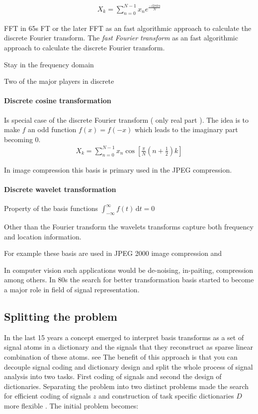 \begin{align*}
 X_k = \sum_{n=0}^{N-1}x_ne^{\frac{-i2\pi kn}{N}}
\end{align*}

FFT in 65s
FT or the later FFT as an fast algorithmic approach to calculate the discrete
Fourier transform.
The \emph{fast Fourier transform}  as an fast algorithmic approach to calculate
the discrete Fourier transform.



Stay in the frequency domain

Two of the major players in discrete 

\paragraph{Discrete cosine transformation}
Is special case of the discrete Fourier transform ( only real part ).
The idea is to make $f$ an odd function $f(x) = f(-x) $ which leads to the
imaginary part becoming 0.
\begin{align*}
X_k = \sum_{n=0}^{N-1}x_n\cos \left[ \frac{\pi}{N} \left(
n+\frac{1}{2}\right) k\right]
\end{align*}
\Todo{}

In image compression this basis is primary used in the JPEG compression.


\paragraph{Discrete wavelet transformation}

Property of the basis functions
$\int_{-\infty}^{\infty} \! f(t) \, \mathrm{d}t = 0$

\Todo{}
Other than the Fourier transform the wavelets transforms capture both frequency
and location information.

For example these basis are used in JPEG 2000 image compression and 

In computer vision such applications would be de-noising, in-paiting,
compression among others. In 80s the search for better transformation basis
started to become a major role in field of signal representation.\cite{}


\subsection{Splitting the problem}
\cite{Rubinstein2010}
In the last 15 years a concept emerged to interpret basis transforms as a set of
signal atoms in a dictionary and the signals that they reconstruct as sparse
linear combination of these atoms. see\cite{Olshausen1996,Mallat1993} The
benefit of this approach is that you can decouple signal coding and dictionary
design and split the whole process of signal analysis into two tasks. First
coding of signals and second the design of dictionaries. Separating the problem
into two distinct problems made the search for efficient coding of signals $z$
and construction of task specific dictionaries $D$ more flexible \cite{?}. The
initial problem becomes:

